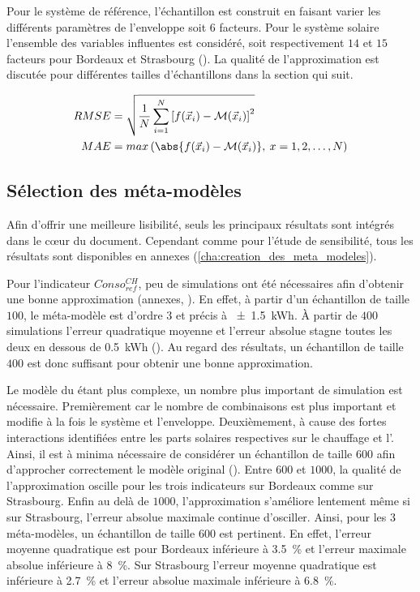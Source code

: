 Pour le système de référence, l’échantillon est construit en faisant varier les différents
paramètres de l’enveloppe soit $6$ facteurs. Pour le système solaire l’ensemble des
variables influentes est considéré, soit respectivement $14$ et $15$ facteurs pour
Bordeaux et Strasbourg ().
La qualité de l’approximation est discutée pour différentes tailles d’échantillons
dans la section qui suit.

\begin{align}
  \label{eq:rmse}
  RMSE &= \sqrt{\frac{1}{N}\sum^{N}_{i=1} \left[ f(\vec{x}_{i}) - \mathcal{M}(\vec{x}_{i}) \right]^{2} } \\
  \label{eq:mae}
  MAE  &= max \left( \abs{f(\vec{x}_{i}) - \mathcal{M}(\vec{x}_{i})}, \: x = 1, 2, \dotsc, N \right)
\end{align}



\subsection{Sélection des méta-modèles} %
\label{sub:selection_des_meta_modeles}
Afin d’offrir une meilleure lisibilité, seuls les principaux résultats sont intégrés dans
le cœur du document. Cependant comme pour l’étude de sensibilité, tous
les résultats sont disponibles en annexes (\ref{cha:creation_des_meta_modeles}).

Pour l’indicateur $Conso_{ref}^{CH}$, peu de simulations ont été nécessaires afin
d’obtenir une bonne approximation (annexes, ). En effet,
à partir d’un échantillon de taille $100$, le méta-modèle est d’ordre $3$ et précis à
\SI{+- 1.5}{kWh}. À partir de $400$ simulations l’erreur quadratique moyenne et l’erreur
absolue stagne toutes les deux en dessous de \SI{0.5}{kWh} ().
Au regard des résultats, un échantillon de taille $400$ est donc suffisant pour obtenir
une bonne approximation.

Le modèle du  étant plus complexe, un nombre plus important de simulation est
nécessaire. Premièrement car le nombre de combinaisons est plus important et modifie à la
fois le système et l’enveloppe. Deuxièmement, à cause des fortes interactions identifiées
entre les parts solaires respectives sur le chauffage et l’. Ainsi, il est à
minima nécessaire de considérer un échantillon de taille $600$ afin d’approcher
correctement le modèle original (). Entre $600$ et $1000$, la qualité
de l’approximation oscille pour les trois indicateurs sur Bordeaux comme sur Strasbourg.
Enfin au delà de $1000$, l’approximation s’améliore lentement même si sur Strasbourg,
l’erreur absolue maximale continue d’osciller. Ainsi, pour les $3$ méta-modèles, un
échantillon de taille $600$ est pertinent. En effet, l’erreur moyenne quadratique est pour
Bordeaux inférieure à \SI{3.5}{\percent} et l’erreur maximale absolue inférieure à \SI{8}{\percent}.
Sur Strasbourg l’erreur moyenne quadratique est inférieure à \SI{2.7}{\percent} et
l’erreur absolue maximale inférieure à \SI{6.8}{\percent}.

